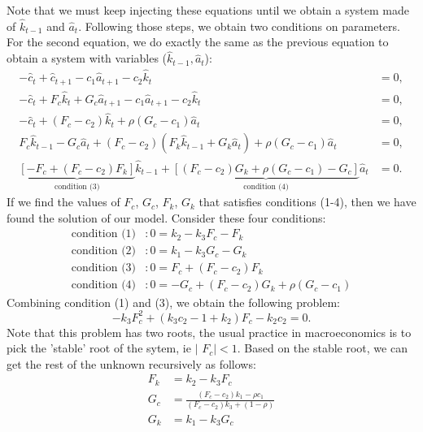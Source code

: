 \documentclass[a4paper,12pt]{article}%
\begin{document}
Note that we must keep injecting these equations until we obtain a system made
of $\hat{k}_{t-1}$ and $\hat{a}_{t}$. Following those steps, we obtain two
conditions on parameters. For the second equation, we do exactly the same as
the previous equation to obtain a system with variables ($\hat{k}_{t-1}%
,\hat{a}_{t}$):
\begin{align*}
-\hat{c}_{t}+\hat{c}_{t+1}-c_{1}\hat{a}_{t+1}-c_{2}\hat{k}_{t}  &  =0,\\
-\hat{c}_{t}+F_{c}\hat{k}_{t}+G_{c}\hat{a}_{t+1}-c_{1}\hat{a}_{t+1}-c_{2}%
\hat{k}_{t}  &  =0,\\
-\hat{c}_{t}+\left(  F_{c}-c_{2}\right)  \hat{k}_{t}+\rho\left(  G_{c}%
-c_{1}\right)  \hat{a}_{t}  &  =0,\\
F_{c}\hat{k}_{t-1}-G_{c}\hat{a}_{t}+\left(  F_{c}-c_{2}\right)  \left(
F_{k}\hat{k}_{t-1}+G_{k}\hat{a}_{t}\right)  +\rho\left(  G_{c}-c_{1}\right)
\hat{a}_{t}  &  =0,\\
\underset{\text{condition (3)}}{\underbrace{\left[  -F_{c}+\left(  F_{c}%
-c_{2}\right)  F_{k}\right]  }}\hat{k}_{t-1}+\underset{\text{condition (4)}%
}{\underbrace{\left[  \left(  F_{c}-c_{2}\right)  G_{k}+\rho\left(
G_{c}-c_{1}\right)  -G_{c}\right]  }}\hat{a}_{t}  &  =0.
\end{align*}
If we find the values of $F_{c}$, $G_{c}$, $F_{k}$, $G_{k}$ that satisfies
conditions (1-4), then we have found the solution of our model. Consider these
four conditions:%
\begin{align*}
\text{condition (1)}  &  :0=k_{2}-k_{3}F_{c}-F_{k}\\
\text{condition (2)}  &  :0=k_{1}-k_{3}G_{c}-G_{k}\\
\text{condition (3)}  &  :0=F_{c}+\left(  F_{c}-c_{2}\right)  F_{k}\\
\text{condition (4)}  &  :0=-G_{c}+\left(  F_{c}-c_{2}\right)  G_{k}%
+\rho\left(  G_{c}-c_{1}\right)
\end{align*}
Combining condition (1) and (3), we obtain the following problem:%
\[
-k_{3}F_{c}^{2}+\left(  k_{3}c_{2}-1+k_{2}\right)  F_{c}-k_{2}c_{2}=0.
\]
Note that this problem has two roots, the usual practice in macroeconomics is
to pick the 'stable' root of the sytem, ie
$\vert$%
$F_{c}|<1$. Based on the stable root, we can get the rest of the unknown
recursively as follows:
\begin{align*}
F_{k}  &  =k_{2}-k_{3}F_{c}\\
G_{c}  &  =\frac{\left(  F_{c}-c_{2}\right)  k_{1}-\rho c_{1}}{\left(
F_{c}-c_{2}\right)  k_{3}+\left(  1-\rho\right)  }\\
G_{k}  &  =k_{1}-k_{3}G_{c}%
\end{align*}
\end{document}
